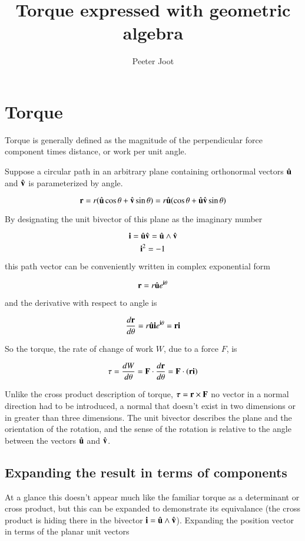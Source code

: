 \documentclass{article}      %
\title{Torque expressed with geometric algebra} %
\author{Peeter Joot}         %
\begin{document}

\maketitle{}

\section{Torque}

Torque is generally defined as the magnitude of the perpendicular force component times distance, or work per unit angle.

Suppose a circular path in an arbitrary plane containing orthonormal vectors $\hat{\mathbf{u}}$ and $\hat{\mathbf{v}}$ is parameterized by angle.

\[
\mathbf{r} = r(\hat{\mathbf{u}} \cos \theta + \hat{\mathbf{v}} \sin \theta) = r \hat{\mathbf{u}}(\cos \theta + \hat{\mathbf{u}} \hat{\mathbf{v}} \sin \theta)
\]

By designating the unit bivector of this plane as the imaginary number

\[
\mathbf{i}  = \hat{\mathbf{u}} \hat{\mathbf{v}} = \hat{\mathbf{u}} \wedge \hat{\mathbf{v}}
\]
\[
\mathbf{i} ^2 = -1
\]

this path vector can be conveniently written in complex exponential form

\[
\mathbf{r} = r \hat{\mathbf{u}} e^{\mathbf{i}  \theta}
\]

and the derivative with respect to angle is

\[
\frac{d \mathbf{r}}{d\theta} = r \hat{\mathbf{u}} \mathbf{i}  e^{\mathbf{i}  \theta} = \mathbf{r}  \mathbf{i} 
\]

So the torque, the rate of change of work $W$, due to a force $F$, is

\[
\tau = \frac{dW}{d\theta} = \mathbf{F} \cdot \frac{d \mathbf{r}}{d\theta} = \mathbf{F} \cdot (\mathbf{r}  \mathbf{i} )
\]

Unlike the cross product description of torque, $\boldsymbol{\tau} = \mathbf{r} \times \mathbf{F}$ no vector in a normal direction had to be introduced, a normal that doesn't exist in two dimensions or in greater than three dimensions.  The unit bivector describes the plane and the orientation of the rotation, and the sense of the rotation is relative to the angle between the vectors $\hat{\mathbf{u}}$ and $\hat{\mathbf{v}}$.

\subsection{Expanding the result in terms of components }

At a glance this doesn't appear much like the familiar torque as a determinant or cross product, but this can be expanded to demonstrate its equivalance (the cross product is hiding there in the bivector $\mathbf{i} = \hat{\mathbf{u}} \wedge \hat{\mathbf{v}}$).  Expanding the position vector in terms of the planar unit vectors 
\end{document}
